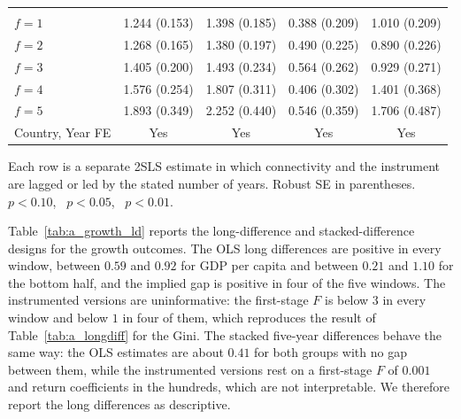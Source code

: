 \begin{table}[H]
\begin{threeparttable}
\begin{tabular}{lcccc}
\addlinespace\multicolumn{5}{l}{\emph{Panel B. Placebo, connectivity led $f$ years}}\\
$f=1$ & 1.244\sym{***} (0.153) & 1.398\sym{***} (0.185) & 0.388\sym{*} (0.209) & 1.010\sym{***} (0.209) \\
$f=2$ & 1.268\sym{***} (0.165) & 1.380\sym{***} (0.197) & 0.490\sym{**} (0.225) & 0.890\sym{***} (0.226) \\
$f=3$ & 1.405\sym{***} (0.200) & 1.493\sym{***} (0.234) & 0.564\sym{**} (0.262) & 0.929\sym{***} (0.271) \\
$f=4$ & 1.576\sym{***} (0.254) & 1.807\sym{***} (0.311) & 0.406 (0.302) & 1.401\sym{***} (0.368) \\
$f=5$ & 1.893\sym{***} (0.349) & 2.252\sym{***} (0.440) & 0.546 (0.359) & 1.706\sym{***} (0.487) \\
\midrule
Country, Year FE & Yes & Yes & Yes & Yes \\
\bottomrule
\end{tabular}
\begin{tablenotes}\footnotesize\item Each row is a separate 2SLS estimate in which connectivity and the instrument are lagged or led by the stated number of years. Robust SE in parentheses. \sym{*}~$p<0.10$, \sym{**}~$p<0.05$, \sym{***}~$p<0.01$.\end{tablenotes}\end{threeparttable}\end{table}

Table~\ref{tab:a_growth_ld} reports the long-difference and stacked-difference designs for the growth outcomes. The OLS long differences are positive in every window, between $0.59$ and $0.92$ for GDP per capita and between $0.21$ and $1.10$ for the bottom half, and the implied gap is positive in four of the five windows. The instrumented versions are uninformative: the first-stage $F$ is below $3$ in every window and below $1$ in four of them, which reproduces the result of Table~\ref{tab:a_longdiff} for the Gini. The stacked five-year differences behave the same way: the OLS estimates are about $0.41$ for both groups with no gap between them, while the instrumented versions rest on a first-stage $F$ of $0.001$ and return coefficients in the hundreds, which are not interpretable. We therefore report the long differences as descriptive.

